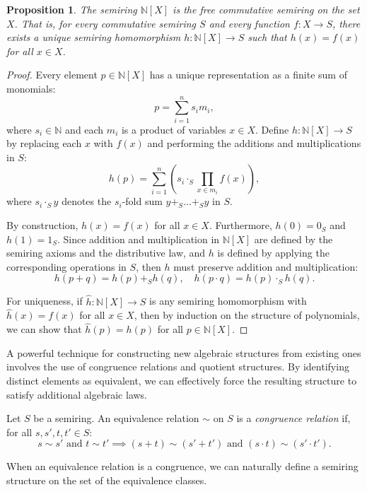 \documentclass[oneside, 11pt]{amsbook}
\theoremstyle{plain}
\newtheorem{prop}[thm]{Proposition}
\theoremstyle{definition}
\theoremstyle{remark}
\begin{document}
\begin{prop}
    \label{prop:polynomialfreesemiring}
    The semiring $\mathbb{N}[X]$ is the free commutative semiring on the set $X$. That is, for every commutative semiring $S$ and every function $f : X \to S$, there exists a unique semiring homomorphism
    $h : \mathbb{N}[X] \to S$ such that $h(x) = f(x)$ for all $x \in X$.
\end{prop}
\begin{proof}
    Every element $p \in \mathbb{N}[X]$ has a unique representation as a finite sum of monomials:
    \[
        p = \sum_{i=1}^n s_i m_i,
    \]
    where $s_i \in \mathbb{N}$ and each $m_i$ is a product of variables $x \in X$. Define $h : \mathbb{N}[X] \to S$ by replacing each $x$ with $f(x)$ and performing the additions and multiplications in $S$:
    \[
        h(p) = \sum_{i=1}^n \left( s_i \cdot_S \prod_{x \in m_i} f(x) \right),
    \]
    where $s_i \cdot_S y$ denotes the $s_i$-fold sum $y +_S \dots +_S y$ in $S$.

    By construction, $h(x) = f(x)$ for all $x \in X$. Furthermore, $h(0) = 0_S$ and $h(1) = 1_S$. Since addition and multiplication in $\mathbb{N}[X]$ are defined by the semiring axioms and the distributive law, and $h$ is defined by applying the corresponding operations in $S$, then $h$ must preserve addition and multiplication:
    \[
        h(p+q) = h(p) +_S h(q), \quad h(p \cdot q) = h(p) \cdot_S h(q).
    \]

    For uniqueness, if $\hat{h} : \mathbb{N}[X] \to S$ is any semiring homomorphism with $\hat{h}(x) = f(x)$ for all $x \in X$, then by induction on the structure of polynomials, we can show that $\hat{h}(p) = h(p)$ for all $p \in \mathbb{N}[X]$.
\end{proof}

A powerful technique for constructing new algebraic structures from existing ones involves the use of congruence relations and quotient structures. By identifying distinct elements as equivalent, we can effectively force the resulting structure to satisfy additional algebraic laws.

\begin{defn}
    Let $S$ be a semiring. An equivalence relation $\sim$ on $S$ is a \emph{congruence relation} if, for all $s, s', t, t' \in S$:
    \[
        s \sim s' \text{ and } t \sim t' \implies (s + t) \sim (s' + t') \text{ and } (s \cdot t) \sim (s' \cdot t').
    \]
\end{defn}

When an equivalence relation is a congruence, we can naturally define a semiring structure on the set of the equivalence classes.
\end{document}
